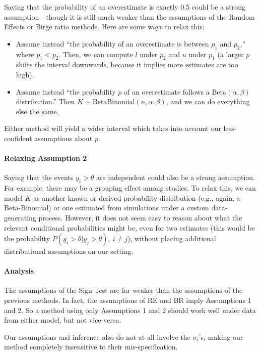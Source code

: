 \documentclass[12pt]{article}
\begin{document}
Saying that the probability of an overestimate is exactly 0.5 could be a strong assumption---though it is still much weaker than the assumptions of the Random Effects or Birge ratio methods. Here are some ways to relax this:

\begin{itemize}
\item
  Assume instead ``the probability of an overestimate is between $p_1$ and $p_2$,'' where $p_1<p_2$. Then, we can compute $l$ under $p_2$ and $u$ under $p_1$ (a larger $p$ shifts the interval downwards, because it implies more estimates are too high).
\item
  Assume instead ``the probability $p$ of an overestimate follows a $\mathrm{Beta}(\alpha,\beta)$ distribution.'' Then $K\sim\mathrm{BetaBinomial}(n,\alpha,\beta)$, and we can do everything else the same.
\end{itemize}

Either method will yield a wider interval which takes into account our less-confident assumptions about $p$.

\paragraph{Relaxing Assumption 2}\label{relaxing-assumption-2}

Saying that the events $y_i>\theta$ are independent could also be a strong assumption. For example, there may be a grouping effect among studies. To relax this, we can model $K$ as another known or derived probability distribution (e.g., again, a Beta-Binomial) or one estimated from simulations under a custom data-generating process. However, it does not seem easy to reason about what the relevant conditional probabilities might be, even for two estimates (this would be the probability $P(y_i>\theta|y_j>\theta),\ i\neq j$), without placing additional distributional assumptions on our setting.

\paragraph{Analysis}\label{analysis}

The assumptions of the Sign Test are far weaker than the assumptions of the previous methods. In fact, the assumptions of RE and BR imply Assumptions 1 and 2. So a method using only Assumptions 1 and 2 should work well under data from either model, but not vice-versa.

Our assumptions and inference also do not at all involve the $\sigma_i$'s, making our method completely insensitive to their mis-specification.
\end{document}
